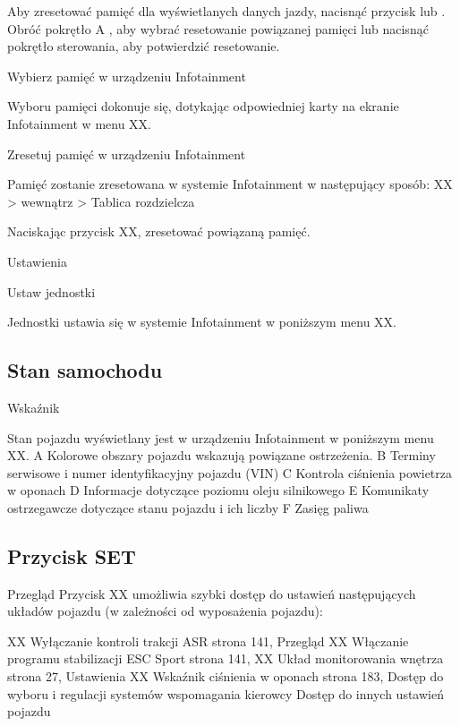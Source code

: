 \begin{itemizeArrow}
	\itemArrow Aby zresetować pamięć dla wyświetlanych danych jazdy, nacisnąć przycisk lub . Obróć pokrętło A , aby wybrać resetowanie powiązanej pamięci lub nacisnąć pokrętło sterowania, aby potwierdzić resetowanie.
\end{itemizeArrow}

Wybierz pamięć w urządzeniu Infotainment

Wyboru pamięci dokonuje się, dotykając odpowiedniej karty na ekranie Infotainment w menu XX.

Zresetuj pamięć w urządzeniu Infotainment

Pamięć zostanie zresetowana w systemie Infotainment w następujący sposób:
XX > wewnątrz > Tablica rozdzielcza

\begin{itemizeArrow}
	\itemArrow Naciskając przycisk XX, zresetować powiązaną pamięć.
\end{itemizeArrow}

Ustawienia

Ustaw jednostki

Jednostki ustawia się w systemie Infotainment w poniższym menu XX.

\subsection{Stan samochodu}

Wskaźnik

Stan pojazdu wyświetlany jest w urządzeniu Infotainment w poniższym menu XX.
A Kolorowe obszary pojazdu wskazują powiązane ostrzeżenia.
B Terminy serwisowe i numer identyfikacyjny pojazdu (VIN)
C Kontrola ciśnienia powietrza w oponach
D Informacje dotyczące poziomu oleju silnikowego
E Komunikaty ostrzegawcze dotyczące stanu pojazdu i ich liczby
F Zasięg paliwa

\subsection{Przycisk SET}

Przegląd
Przycisk XX umożliwia szybki dostęp do ustawień następujących układów pojazdu (w zależności od wyposażenia pojazdu):
\begin{itemizeTriangle}
	\itemTriangle XX Wyłączanie kontroli trakcji ASR \guillemotright strona 141, Przegląd
	\itemTriangle XX Włączanie programu stabilizacji ESC Sport \guillemotright strona 141,
	\itemTriangle XX Układ monitorowania wnętrza \guillemotright strona 27, Ustawienia
	\itemTriangle XX Wskaźnik ciśnienia w oponach \guillemotright strona 183,
	\itemTriangle Dostęp do wyboru i regulacji systemów wspomagania kierowcy
	\itemTriangle Dostęp do innych ustawień pojazdu
\end{itemizeTriangle}


